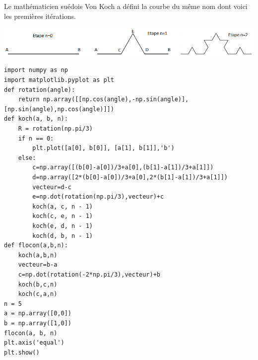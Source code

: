 Le mathématicien suédois Von Koch a défini la courbe du même nom dont voici les premières itérations.

\begin{center}
\includegraphics[width=.95\linewidth]{images/etapes_flocon}
\end{center}









\begin{lstlisting}
import numpy as np
import matplotlib.pyplot as plt
def rotation(angle):
    return np.array([[np.cos(angle),-np.sin(angle)],[np.sin(angle),np.cos(angle)]])
def koch(a, b, n):
    R = rotation(np.pi/3)
    if n == 0:
        plt.plot([a[0], b[0]], [a[1], b[1]],'b')
    else:
        c=np.array([(b[0]-a[0])/3+a[0],(b[1]-a[1])/3+a[1]])
        d=np.array([2*(b[0]-a[0])/3+a[0],2*(b[1]-a[1])/3+a[1]])
        vecteur=d-c
        e=np.dot(rotation(np.pi/3),vecteur)+c
        koch(a, c, n - 1)
        koch(c, e, n - 1)
        koch(e, d, n - 1)
        koch(d, b, n - 1)     
def flocon(a,b,n):
    koch(a,b,n)
    vecteur=b-a
    c=np.dot(rotation(-2*np.pi/3),vecteur)+b
    koch(b,c,n)
    koch(c,a,n)
n = 5
a = np.array([0,0])
b = np.array([1,0])
flocon(a, b, n)
plt.axis('equal')
plt.show()
\end{lstlisting}


